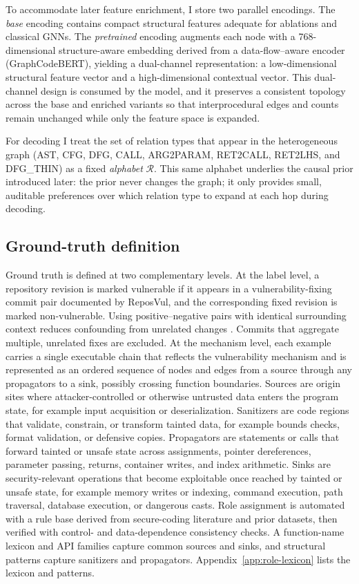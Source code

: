 \documentclass{buthesis}
\begin{document}
To accommodate later feature enrichment, I store two parallel encodings. The \emph{base} encoding contains compact structural features adequate for ablations and classical GNNs. The \emph{pretrained} encoding augments each node with a 768-dimensional structure-aware embedding derived from a data-flow–aware encoder (GraphCodeBERT), yielding a dual-channel representation: a low-dimensional structural feature vector and a high-dimensional contextual vector. This dual-channel design is consumed by the model, and it preserves a consistent topology across the base and enriched variants so that interprocedural edges and counts remain unchanged while only the feature space is expanded.

For decoding I treat the set of relation types that appear in the heterogeneous graph (\textsc{AST}, \textsc{CFG}, \textsc{DFG}, \textsc{CALL}, \textsc{ARG2PARAM}, \textsc{RET2CALL}, \textsc{RET2LHS}, and \textsc{DFG\_THIN}) as a fixed \emph{alphabet} $\mathcal{R}$. This same alphabet underlies the causal prior introduced later: the prior never changes the graph; it only provides small, auditable preferences over which relation type to expand at each hop during decoding.



\subsection{Ground-truth definition}
\label{subsec:gt-definition}

Ground truth is defined at two complementary levels. At the label level, a repository revision is marked vulnerable if it appears in a vulnerability-fixing commit pair documented by ReposVul, and the corresponding fixed revision is marked non-vulnerable. Using positive–negative pairs with identical surrounding context reduces confounding from unrelated changes \cite{wang2024reposvul}. Commits that aggregate multiple, unrelated fixes are excluded. At the mechanism level, each example carries a single executable chain that reflects the vulnerability mechanism and is represented as an ordered sequence of nodes and edges from a source through any propagators to a sink, possibly crossing function boundaries. Sources are origin sites where attacker-controlled or otherwise untrusted data enters the program state, for example input acquisition or deserialization. Sanitizers are code regions that validate, constrain, or transform tainted data, for example bounds checks, format validation, or defensive copies. Propagators are statements or calls that forward tainted or unsafe state across assignments, pointer dereferences, parameter passing, returns, container writes, and index arithmetic. Sinks are security-relevant operations that become exploitable once reached by tainted or unsafe state, for example memory writes or indexing, command execution, path traversal, database execution, or dangerous casts. Role assignment is automated with a rule base derived from secure-coding literature and prior datasets, then verified with control- and data-dependence consistency checks. A function-name lexicon and API families capture common sources and sinks, and structural patterns capture sanitizers and propagators. Appendix~\ref{app:role-lexicon} lists the lexicon and patterns.
\end{document}
